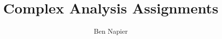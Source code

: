 \documentclass[a4paper, answers]{exam}
\title{Complex Analysis Assignments}
\author{Ben Napier}
\begin{document}
    \maketitle
    \begin{questions}
        
        
        
        
        
        
%       
        
    \end{questions}
\end{document}
